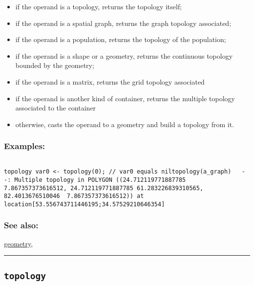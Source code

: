\documentclass[]{book}
\providecommand{\tightlist}{%
  \setlength{\itemsep}{0pt}\setlength{\parskip}{0pt}}
\theoremstyle{definition}
\theoremstyle{definition}
\theoremstyle{definition}
\theoremstyle{remark}
\begin{document}
\begin{itemize}
\tightlist
\item
  if the operand is a topology, returns the topology itself;\\
\item
  if the operand is a spatial graph, returns the graph topology
  associated;\\
\item
  if the operand is a population, returns the topology of the
  population;\\
\item
  if the operand is a shape or a geometry, returns the continuous
  topology bounded by the geometry;\\
\item
  if the operand is a matrix, returns the grid topology associated\\
\item
  if the operand is another kind of container, returns the multiple
  topology associated to the container\\
\item
  otherwise, casts the operand to a geometry and build a topology from
  it.
\end{itemize}

\subsubsection{Examples:}\label{examples-363}

\begin{verbatim}
 
topology var0 <- topology(0); // var0 equals niltopology(a_graph)   --: Multiple topology in POLYGON ((24.712119771887785 7.867357373616512, 24.712119771887785 61.283226839310565, 82.4013676510046  7.867357373616512)) at location[53.556743711446195;34.57529210646354] 
\end{verbatim}

\subsubsection{See also:}\label{see-also-206}

\href{operators-d-to-h.html\#geometry}{geometry},

\begin{center}\rule{0.5\linewidth}{\linethickness}\end{center}

\subsection{\texorpdfstring{\texttt{topology}}{topology}}\label{topology-1}
\end{document}
